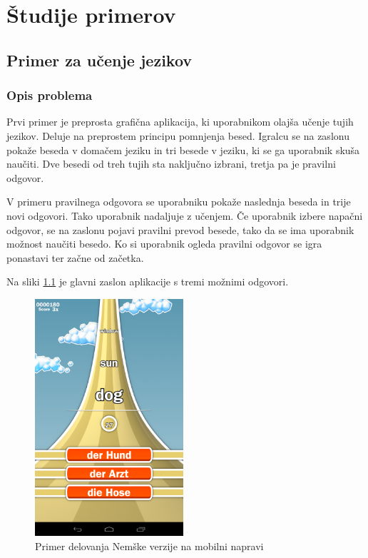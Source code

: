 \chapter{Študije primerov}

\section{Primer za učenje jezikov}

\subsection{Opis problema}

Prvi primer je preprosta grafična aplikacija, ki uporabnikom olajša učenje tujih jezikov. Deluje na preprostem principu pomnjenja besed. Igralcu se na zaslonu pokaže beseda v domačem jeziku in tri besede v jeziku, ki se ga uporabnik skuša naučiti. Dve besedi od treh tujih sta naključno izbrani, tretja pa je pravilni odgovor.

V primeru pravilnega odgovora se uporabniku pokaže naslednja beseda in trije novi odgovori. Tako uporabnik nadaljuje z učenjem. Če uporabnik izbere napačni odgovor, se na zaslonu pojavi pravilni prevod besede, tako da se ima uporabnik možnost naučiti besedo. Ko si uporabnik ogleda pravilni odgovor se igra ponastavi ter začne od začetka.

Na sliki \ref{german} je glavni zaslon aplikacije s tremi možnimi odgovori.

\begin{figure}
\begin{center}
\includegraphics[width=5.5cm]{pic/defg-german.png}
\end{center}
\caption{Primer delovanja Nemške verzije na mobilni napravi}
\label{german}
\end{figure} 

